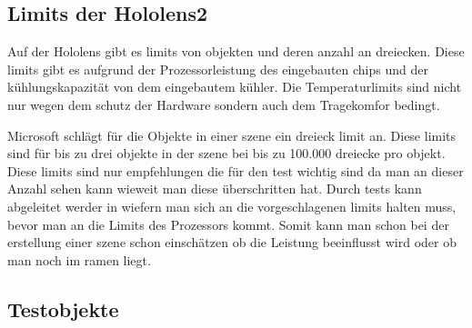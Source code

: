
\subsection{Limits der Hololens2}\label{subsec:Limits der Hololens2}

Auf der Hololens gibt es limits von objekten und deren anzahl an dreiecken.
Diese limits gibt es aufgrund der Prozessorleistung des eingebauten chips und der kühlungskapazität von dem eingebautem kühler.
Die Temperaturlimits sind nicht nur wegen dem schutz der Hardware sondern auch dem Tragekomfor bedingt. 

Microsoft schlägt für die Objekte in einer szene ein dreieck limit an. Diese limits sind für bis zu drei objekte in der szene bei bis zu 100.000\autocite{optimize_3d} dreiecke pro objekt. 
Diese limits sind nur empfehlungen die für den test wichtig sind da man an dieser Anzahl sehen kann wieweit man diese überschritten hat.
Durch tests kann abgeleitet werder in wiefern man sich an die vorgeschlagenen limits halten muss, bevor man an die Limits des Prozessors kommt.
Somit kann man schon bei der erstellung einer szene schon einschätzen ob die Leistung beeinflusst wird oder ob man noch im ramen liegt.


\newpage
\subsection{Testobjekte}\label{subsec:Testobjekte}


